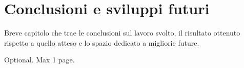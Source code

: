 \documentclass[12pt,a4paper,openright,twoside]{book}
\begin{document}
\chapter{Conclusioni e sviluppi futuri}

Breve capitolo che trae le conclusioni sul lavoro svolto, il risultato ottenuto rispetto a quello atteso e lo spazio dedicato a migliorie future.

%
%

\backmatter




\begin{acknowledgements} %
    Optional. Max 1 page.
\end{acknowledgements}
\end{document}
